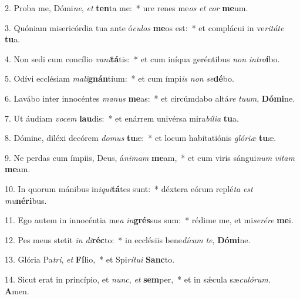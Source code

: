 2. Proba me, Dómi\textit{ne}, \textit{et} \textbf{ten}ta me:~*  ure renes me\textit{os} \textit{et} \textit{cor} \textbf{me}um.\

3. Quóniam misericórdia tua ante ó\textit{cu}\textit{los} \textbf{me}os est:~*  et complácui in ve\textit{ri}\textit{tá}\textit{te} \textbf{tu}a.\

4. Non sedi cum concílio \textit{va}\textit{ni}\textbf{tá}tis:~*  et cum iníqua geréntibus \textit{non} \textit{in}\textit{tro}\textbf{í}bo.\

5. Odívi ecclésiam \textit{ma}\textit{li}\textbf{gnán}tium:~*  et cum ímpi\textit{is} \textit{non} \textit{se}\textbf{dé}bo.\

6. Lavábo inter innocéntes \textit{ma}\textit{nus} \textbf{me}as:~*  et circúmdabo altá\textit{re} \textit{tu}\textit{um}, \textbf{Dó}\textbf{mi}ne.\

7. Ut áudiam \textit{vo}\textit{cem} \textbf{lau}dis:~*  et enárrem univérsa mira\textit{bí}\textit{li}\textit{a} \textbf{tu}a.\

8. Dómine, diléxi decórem \textit{do}\textit{mus} \textbf{tu}æ:~*  et locum habitatiónis \textit{gló}\textit{ri}\textit{æ} \textbf{tu}æ.\

9. Ne perdas cum ímpiis, Deus, á\textit{ni}\textit{mam} \textbf{me}am,~*  et cum viris sángui\textit{num} \textit{vi}\textit{tam} \textbf{me}am.\

10. In quorum mánibus in\textit{i}\textit{qui}\textbf{tá}tes sunt:~*  déxtera eórum replé\textit{ta} \textit{est} \textit{mu}\textbf{né}\textbf{ri}bus.\

11. Ego autem in innocéntia me\textit{a} \textit{in}\textbf{grés}sus sum:~*  rédime me, et mi\textit{se}\textit{ré}\textit{re} \textbf{me}i.\

12. Pes meus stetit \textit{in} \textit{di}\textbf{réc}to:~*  in ecclésiis bene\textit{dí}\textit{cam} \textit{te}, \textbf{Dó}\textbf{mi}ne.\

13. Glória Pa\textit{tri}, \textit{et} \textbf{Fí}lio,~*  et Spi\textit{rí}\textit{tu}\textit{i} \textbf{Sanc}to.\

14. Sicut erat in princípio, et \textit{nunc}, \textit{et} \textbf{sem}per,~*  et in sǽcula sæ\textit{cu}\textit{ló}\textit{rum}. \textbf{A}men.\

